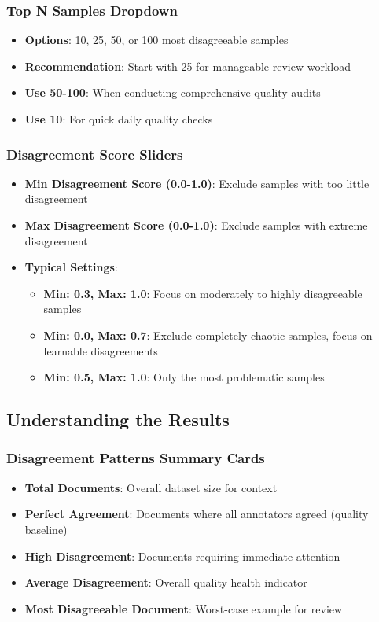 \documentclass[11pt]{article}
\begin{document}
\subsubsection{Top N Samples Dropdown}
\begin{itemize}
\item \textbf{Options}: 10, 25, 50, or 100 most disagreeable samples
\item \textbf{Recommendation}: Start with 25 for manageable review workload
\item \textbf{Use 50-100}: When conducting comprehensive quality audits
\item \textbf{Use 10}: For quick daily quality checks
\end{itemize}

\subsubsection{Disagreement Score Sliders}
\begin{itemize}
\item \textbf{Min Disagreement Score (0.0-1.0)}: Exclude samples with too little disagreement
\item \textbf{Max Disagreement Score (0.0-1.0)}: Exclude samples with extreme disagreement
\item \textbf{Typical Settings}:
\begin{itemize}
\item \textbf{Min: 0.3, Max: 1.0}: Focus on moderately to highly disagreeable samples
\item \textbf{Min: 0.0, Max: 0.7}: Exclude completely chaotic samples, focus on learnable disagreements
\item \textbf{Min: 0.5, Max: 1.0}: Only the most problematic samples
\end{itemize}
\end{itemize}

\subsection{Understanding the Results}

\subsubsection{Disagreement Patterns Summary Cards}
\begin{itemize}
\item \textbf{Total Documents}: Overall dataset size for context
\item \textbf{Perfect Agreement}: Documents where all annotators agreed (quality baseline)
\item \textbf{High Disagreement}: Documents requiring immediate attention
\item \textbf{Average Disagreement}: Overall quality health indicator
\item \textbf{Most Disagreeable Document}: Worst-case example for review
\end{itemize}
\end{document}
